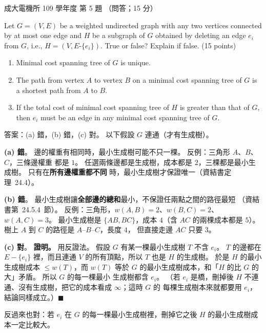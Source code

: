 \begin{pastexam}[label={px:ncku-109-ee-ds-05}]{成大電機所 109 學年度 第 5 題}
（問答；15 分）

Let $G=(V,E)$ be a weighted undirected graph with any two vertices connected by at most one edge
and $H$ be a subgraph of $G$ obtained by deleting an edge $e_i$ from $G$, i.e.,
$H=(V,E\text{-}\{e_i\})$. True or false? Explain if false. (15 points)
\begin{enumerate}[label=(\alph*)]
\item Minimal cost spanning tree of $G$ is unique.
\item The path from vertex $A$ to vertex $B$ on a minimal cost spanning tree of $G$ is a shortest
path from $A$ to $B$.
\item If the total cost of minimal cost spanning tree of $H$ is greater than that of $G$, then $e_i$
must be an edge in any minimal cost spanning tree of $G$.
\end{enumerate}
\end{pastexam}

\begin{pastsoln}
答案：(a) 錯，(b) 錯，(c) 對。 以下假設 $G$ 連通（才有生成樹）。

\textbf{(a) 錯}。 邊的權重有相同時，最小生成樹可能不只一棵。 反例：三角形 $A$、$B$、$C$，三條邊權重
都是 $1$。 任選兩條邊都是生成樹，成本都是 $2$，三棵都是最小生成樹。 只有在\textbf{所有邊權重都不同}
時，最小生成樹才保證唯一（資結書定理~24.4）。

\textbf{(b) 錯}。 最小生成樹讓\textbf{全部邊的總和}最小，不保證任兩點之間的路徑最短
（資結書第~24.5.4~節）。 反例：三角形，$w(A, B) = 2$、$w(B, C) = 2$、$w(A, C) = 3$。 最小生成樹是
$\{AB, BC\}$，成本 $4$（含 $AC$ 的兩棵成本都是 $5$）。 樹上 $A$ 到 $C$ 的路徑是 $A$--$B$--$C$，長度 $4$，
但直接走邊 $AC$ 只要 $3$。
\begin{center}
\end{center}

\textbf{(c) 對}。 \textbf{證明。} 用反證法。 假設 $G$ 有某一棵最小生成樹 $T$ 不含 $e_i$。 $T$ 的邊都在
$E - \{e_i\}$ 裡，而且連通 $V$ 的所有頂點，所以 $T$ 也是 $H$ 的生成樹。 於是 $H$ 的最小生成樹成本
$\le w(T)$，而 $w(T)$ 等於 $G$ 的最小生成樹成本，和「$H$ 的比 $G$ 的大」矛盾。 所以 $G$ 的每一棵最小
生成樹都含 $e_i$。 （若 $e_i$ 是橋，刪掉後 $H$ 不連通、沒有生成樹，把它的成本看成 $\infty$；這時 $G$ 的
每棵生成樹本來就都要用 $e_i$，結論同樣成立。）\hfill$\blacksquare$

反過來也對：若 $e_i$ 在 $G$ 的每一棵最小生成樹裡，刪掉它之後 $H$ 的最小生成樹成本一定比較大。
\end{pastsoln}
